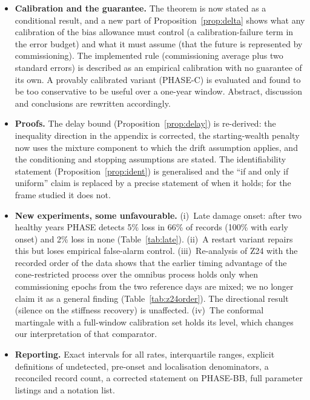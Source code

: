 \documentclass[11pt,a4paper]{article}
\newcommand{\tref}[1]{Table~\ref{#1}}
\newcommand{\pref}[1]{Proposition~\ref{#1}}
\begin{document}
\begin{itemize}
\item \textbf{Calibration and the guarantee.} The theorem is now stated as a conditional result, and a new part of \pref{prop:delta} shows what any calibration of the bias allowance must control (a calibration-failure term in the error budget) and what it must assume (that the future is represented by commissioning). The implemented rule (commissioning average plus two standard errors) is described as an empirical calibration with no guarantee of its own. A provably calibrated variant (PHASE-C) is evaluated and found to be too conservative to be useful over a one-year window. Abstract, discussion and conclusions are rewritten accordingly.
\item \textbf{Proofs.} The delay bound (\pref{prop:delay}) is re-derived: the inequality direction in the appendix is corrected, the starting-wealth penalty now uses the mixture component to which the drift assumption applies, and the conditioning and stopping assumptions are stated. The identifiability statement (\pref{prop:ident}) is generalised and the ``if and only if uniform'' claim is replaced by a precise statement of when it holds; for the frame studied it does not.
\item \textbf{New experiments, some unfavourable.} (i)~Late damage onset: after two healthy years PHASE detects 5\% loss in 66\% of records (100\% with early onset) and 2\% loss in none (\tref{tab:late}). (ii)~A restart variant repairs this but loses empirical false-alarm control. (iii)~Re-analysis of Z24 with the recorded order of the data shows that the earlier timing advantage of the cone-restricted process over the omnibus process holds only when commissioning epochs from the two reference days are mixed; we no longer claim it as a general finding (\tref{tab:z24order}). The directional result (silence on the stiffness recovery) is unaffected. (iv)~The conformal martingale with a full-window calibration set holds its level, which changes our interpretation of that comparator.
\item \textbf{Reporting.} Exact intervals for all rates, interquartile ranges, explicit definitions of undetected, pre-onset and localisation denominators, a reconciled record count, a corrected statement on PHASE-BB, full parameter listings and a notation list.

\end{itemize}
\end{document}
